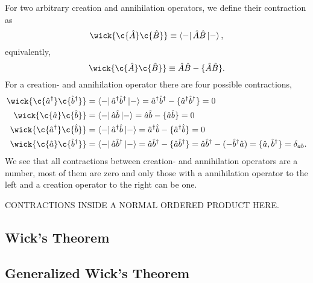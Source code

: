         For two arbitrary creation and annihilation operators, we define their contraction
        as 
        \begin{equation}
            \wick{\c {\hat{A}} \c {\hat{B}} } \equiv \bra{-} \hat{A} \hat{B}\ket{-},
        \end{equation}
        equivalently,
        \begin{equation}
            \wick{\c {\hat{A}} \c {\hat{B}} } \equiv \hat{A}\hat{B} - \{\hat{A} \hat{B}\}.
        \end{equation}
        For a creation- and annihilation operator there are four possible contractions,
        \begin{equation}
            \begin{aligned}
            \wick{\c{\hat{a}^\dagger} \c{\hat{b}^\dagger}} 
            &= \bra{-}\hat{a}^\dagger \hat{b}^\dagger \ket{-}
            = \hat{a}^\dagger \hat{b}^\dagger - \{\hat{a}^\dagger \hat{b}^\dagger\}
            = 0 \\
            \wick{\c{\hat{a}} \c{\hat{b}}} 
            &= \bra{-}\hat{a} \hat{b} \ket{-}
            = \hat{a} \hat{b} - \{\hat{a} \hat{b}\}
            = 0 \\
            \wick{\c{\hat{a}^\dagger} \c{\hat{b}}} 
            &= \bra{-}\hat{a}^\dagger \hat{b} \ket{-}
            = \hat{a}^\dagger \hat{b} - \{\hat{a}^\dagger \hat{b}\}
            = 0 \\
            \wick{\c{\hat{a}} \c{\hat{b}^\dagger}} 
            &= \bra{-}\hat{a} \hat{b}^\dagger \ket{-}
            = \hat{a} \hat{b}^\dagger - \{\hat{a} \hat{b}^\dagger\}
            = \hat{a} \hat{b}^\dagger - (- \hat{b}^\dagger\hat{a})
            = \{\hat{a}, \hat{b}^\dagger \} = \delta_{ab}.
            \end{aligned}
        \end{equation}
        We see that all contractions between creation- and annihilation operators
        are a number, most of them are zero and only those with a annihilation operator
        to the left and a creation operator to the right can be one.
       
        CONTRACTIONS INSIDE A NORMAL ORDERED PRODUCT HERE.

    \subsection{Wick's Theorem}

    \subsection{Generalized Wick's Theorem}

